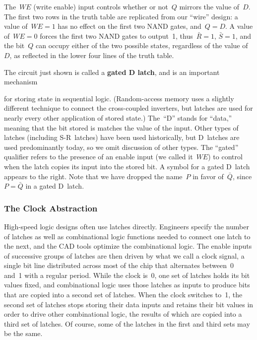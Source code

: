 \begin{minipage}{5.15in}
The~$WE$ (write enable) input controls whether or not~$Q$ mirrors
the value of~$D$.  The first two rows in the truth table are replicated
from our ``wire'' design: a value of~$WE=1$ has no effect on the first
two NAND gates, and~$Q=D$.  A value of~$WE=0$ forces the
first two NAND gates to output~1, thus~$\bar{R}=1$, $\bar{S}=1$,
and the bit~$Q$ can
occupy either of the two possible states, regardless of the value
of~$D$, as reflected in the lower four lines of the truth table.\mpline

The circuit just shown is called a {\bf gated D latch}, and is an
important mechanism\linebreak
\end{minipage}\hspace{0.25in}%
\begin{minipage}{1.1in}
\vspace{12pt}
\end{minipage}\mpdone

for storing state in sequential 
logic.  (Random-access memory uses a slightly different 
technique to connect the cross-coupled inverters, but latches are
used for nearly every other application of stored state.)
The~``D''
stands for ``data,'' meaning that the bit stored is matches
the value of the input.  Other types of latches (including
\mbox{S-R~latches}) have been used historically, but
D~latches are used predominantly today, so we omit discussion of
other types.
The ``gated'' qualifier refers to the presence of an enable input
(we called it~$WE$) to control
when the latch copies its input into the stored bit.
A symbol for a gated D~latch appears to the right.  Note that we have
dropped the name~$P$ in favor of~$\bar{Q}$, since $P=\bar{Q}$
in a gated D~latch.\\ 

\subsubsection{The Clock Abstraction}

High-speed logic designs often use latches directly.  Engineers
specify the number of latches as well as combinational logic 
functions needed to connect one latch to the next,
and the CAD tools optimize the combinational logic.
The enable inputs of successive groups of latches are then driven
by what we call a clock signal, a single bit line distributed across
most of the chip that alternates between~0 and~1 with a regular
period.  While the clock is~0, one set of latches holds its bit values fixed,
and combinational logic uses those latches as inputs to produce 
bits that are copied into a
second set of latches.  When the clock switches to~1, the second
set of latches stops storing their data inputs and
retains their bit values in order to drive other combinational logic,
the results of which are copied into a third set of latches.
Of course, some of the latches in the first and third sets may be the
same.

